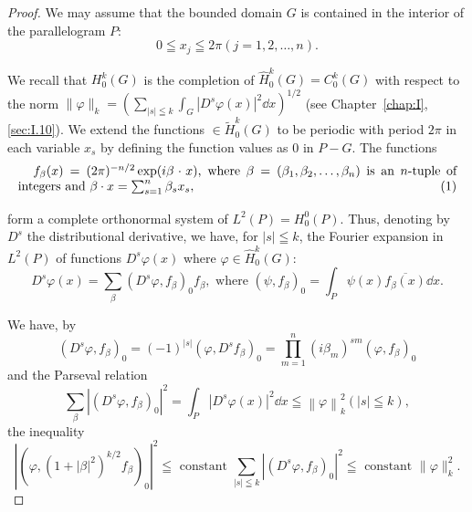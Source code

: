 \begin{proof}
 We may assume that the bounded domain $G$ is contained in the interior of the parallelogram $P$: 
\[
0 \leqq x _{j} \leqq 2 \pi (j = 1, 2, \dots , n). \]

We recall that $H_0^k (G)$ is the completion of $\hat{H}_0^k (G) = C_0^k (G)$ with respect to the norm $\|\varphi \|_k = \left(\sum\limits_{|s|\leqq k}\int_G |D^s\varphi (x)|^2 \dd x\right)^{1/2}$ (see Chapter~\ref{chap:I}, \ref{sec:I.10}). We 
extend the functions $\in \tilde{H}_0^k (G)$ to be periodic with period $2\pi$ in each variable $x_{s}$ by defining the function values as $0$ in $P - G$. The functions 
\begin{equation}\notag
\refstepcounter{equation}\label{eq:X.2.9}%
\parbox[b]{\linewidth}{\setlength{\parindent}{1.2em}\setlength{\parfillskip}{0pt}$f _{\beta} (x) = (2 \pi) ^{-n/2} \exp (i \beta \cdot x)$, where $\beta = (\beta_{1}, \beta_{2}, \dots , \beta_{n})$ is an $n$-tuple of integers and \mbox{$\beta \cdot x = \sum\limits_{s=1}^{n} \beta_s x_s,$}\hfill(\theequation)}
\end{equation}


form a complete orthonormal system of $L^2(P) = H_0^0(P)$. Thus, denoting by $D^s$ the distributional derivative, we have, for $|s| \leqq k$, the Fourier expansion in $L^2(P)$ of functions $D^s\varphi(x)$ where $\varphi \in \hat{H}_0^k(G)$: 
\begin{equation}\label{eq:X.2.10}
D ^{s} \varphi (x) = \sum\limits_{\beta} \left(D ^{s} \varphi , f _{\beta}\right) _{0} f _{\beta}, \text{ where } (\psi , f _{\beta}) _{0} = \int_{P} \psi (x) \overline {{f _{\beta} (x)}} \dd x.
\end{equation}

We have, by 
\[
(D ^{s} \varphi , f _{\beta}) _{0} = (- 1) ^{|s|} (\varphi , D ^{s} f _{\beta}) _{0} = \prod\limits_{m=1} ^{n} (i \beta_{m}) ^{sm} (\varphi , f _{\beta}) _{0}
\]
and the Parseval relation 
\[
\sum\limits_{\beta} \left| (D ^{s} \varphi , f _{\beta}) _{0} \right| ^{2} = \int_{P} \left| D ^{s} \varphi (x) \right| ^{2} \dd x \leqq \left\| \varphi \right\| _{k} ^{2} (| s | \leqq k),
\]
the inequality 
\[
\left| \left(\varphi , (1 + | \beta | ^{2}) ^{k/2} f _{\beta}\right) _{0} \right| ^{2} \leqq \text{ constant } \sum\limits_{| s | \leqq k} \left| \left(D ^{s} \varphi , f _{\beta}\right) _{0} \right| ^{2} \leqq \text{ constant } \| \varphi \| _{k} ^{2}.
\]


\end{proof}
